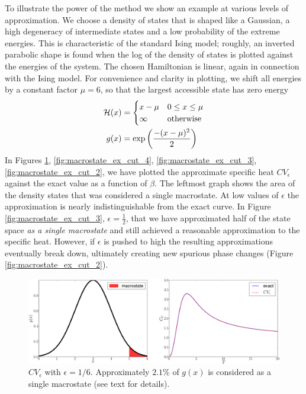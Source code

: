 To illustrate the power of the method we show an example at various levels of approximation. We choose a density of states that is shaped like a Gaussian, \ie a high degeneracy of intermediate states and a low probability of the extreme energies. This is characteristic of the standard Ising model; roughly, an inverted parabolic shape is found when the log of the density of states is plotted against the energies of the system. The chosen Hamiltonian is linear, again in connection with the Ising model. For convenience and clarity in plotting, we shift all energies by a constant factor $\mu=6$, so that the largest accessible state has zero energy
%
\begin{align}
  \mathcal{H}(x) &= 
  \begin{cases}
    x-\mu & 0 \le x \le \mu \\
    \infty & \text{otherwise}
  \end{cases} \\
  g(x) &= \exp  \left(  \frac{-(x-\mu)^2}{2}  \right)
\end{align}
In Figures \ref{fig:macrostate_ex_cut_5}, \ref{fig:macrostate_ex_cut_4}, 
\ref{fig:macrostate_ex_cut_3}, \ref{fig:macrostate_ex_cut_2}, we have plotted the approximate specific heat $CV_\epsilon$ against the exact value as a function of $\beta$. The leftmost graph shows the area of the density states that was considered a single macrostate. At low values of $\epsilon$ the approximation is nearly indistinguishable from the exact curve. In Figure \ref{fig:macrostate_ex_cut_3}, $\epsilon=\frac{1}{2}$, that we have approximated half of the state space \emph{as a single macrostate} and still achieved a reasonable approximation to the specific heat. However, if $\epsilon$ is pushed to high the resulting approximations eventually break down, ultimately creating new spurious phase changes (Figure \ref{fig:macrostate_ex_cut_2}).
%
\begin{figure}[ht]
  \includegraphics[width=\textwidth]{supplement/macrostate_approx_example/pictures/macrostate_epsilon_0211664312906_5.pdf}
  \caption{$CV_{\epsilon}$ with $\epsilon = 1/6$. Approximately $2.1\%$ of $g(x)$ is considered as a single macrostate (see text for details). }
  \label{fig:macrostate_ex_cut_5}
\end{figure}
